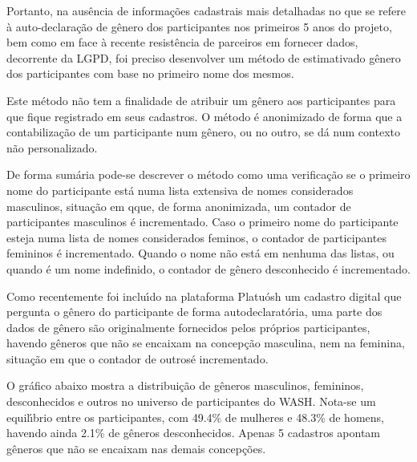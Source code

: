 \documentclass[
12pt,		%
openright,	%
twoside,  %
a4paper,			%
chapter=TITLE,		%
english,			%
french,				%
spanish,			%
brazil				%
]{USPSC-classe/USPSC_RedarTex}
\begin{document}
Portanto, na aus\^encia de informa\c{c}\~oes cadastrais mais detalhadas no que se refere \`a auto-declara\c{c}\~ao de g\^enero dos participantes nos primeiros 5 anos do projeto, bem como em face \`a recente resist\^encia de parceiros em fornecer dados, decorrente da LGPD, foi preciso desenvolver um m\'etodo de \textquotedbl estimativa\textquotedbl  do g\^enero dos participantes com base no primeiro nome dos mesmos.








Este m\'etodo n\~ao tem a finalidade de atribuir um g\^enero aos participantes para que fique registrado em seus cadastros. O m\'etodo \'e anonimizado de forma que a contabiliza\c{c}\~ao de um participante num g\^enero, ou no outro, se d\'a num contexto n\~ao personalizado.








De forma sum\'aria pode-se descrever o m\'etodo como uma verifica\c{c}\~ao se o primeiro nome do participante est\'a numa lista extensiva de nomes \textquotedbl considerados masculinos\textquotedbl , situa\c{c}\~ao em qque, de forma anonimizada, um contador de participantes masculinos \'e incrementado. Caso o primeiro nome do participante esteja numa lista de nomes \textquotedbl considerados feminos\textquotedbl , o contador de participantes femininos \'e incrementado. Quando o nome n\~ao est\'a em nenhuma das listas, ou quando \'e um nome indefinido, o contador de \textquotedbl g\^enero desconhecido \'e incrementado\textquotedbl .








Como recentemente foi inclu\'{\i}do na plataforma Platu\'osh um cadastro digital que pergunta o g\^enero do participante de forma autodeclarat\'oria, uma parte dos dados de g\^enero s\~ao originalmente fornecidos pelos pr\'oprios participantes, havendo g\^eneros que n\~ao se encaixam na concep\c{c}\~ao \textquotedbl masculina\textquotedbl , nem na \textquotedbl feminina\textquotedbl , situa\c{c}\~ao em que o contador de \textquotedbl outros\textquotedbl  \'e incrementado.








O gr\'afico abaixo mostra a distribui\c{c}\~ao de g\^eneros masculinos, femininos, desconhecidos e outros no universo de participantes do WASH. Nota-se um equil\'{\i}brio entre os participantes, com 49.4\% de mulheres e 48.3\% de homens, havendo ainda 2.1\% de g\^eneros desconhecidos. Apenas 5 cadastros apontam g\^eneros que n\~ao se encaixam nas demais concep\c{c}\~oes.
\end{document}
